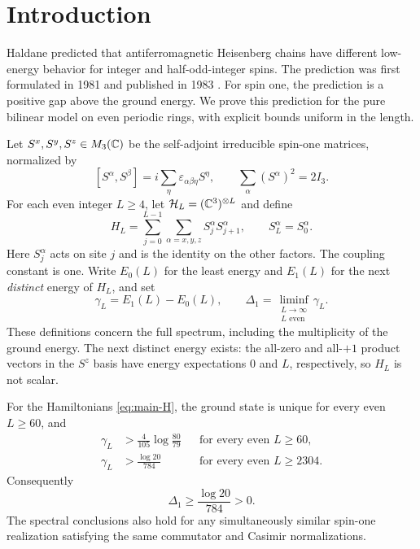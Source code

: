 \section{Introduction}\label{sec:introduction}

Haldane predicted that antiferromagnetic Heisenberg chains have different
low-energy behavior for integer and half-odd-integer spins. The prediction
was first formulated in 1981 and published in 1983
\cite{Haldane1981,Haldane1983PRL,Haldane1983PLA}. For spin one, the prediction is a
positive gap above the ground energy. We prove this prediction for the
pure bilinear model on even periodic rings, with explicit bounds uniform
in the length.

Let $S^x,S^y,S^z\in M_3(\mathbb C)$ be the self-adjoint irreducible spin-one
matrices, normalized by
\[
 [S^\alpha,S^\beta]
   =i\sum_\eta\varepsilon_{\alpha\beta\eta}S^\eta,
 \qquad \sum_\alpha(S^\alpha)^2=2I_3.
\]
For each even integer $L\ge4$, let $\mathcal H_L=(\mathbb C^3)^{\otimes L}$ and define
\begin{equation}\label{eq:main-H}
 H_L=\sum_{j=0}^{L-1}\sum_{\alpha=x,y,z}
       S_j^\alpha S_{j+1}^\alpha,
 \qquad S_L^\alpha=S_0^\alpha.
\end{equation}
Here $S_j^\alpha$ acts on site $j$ and is the identity on the other
factors. The coupling constant is one. Write $E_0(L)$ for the least
energy and $E_1(L)$ for the next \emph{distinct} energy of $H_L$, and set
\begin{equation}\label{eq:main-gap}
 \gamma_L=E_1(L)-E_0(L),
 \qquad
 \Delta_1=\liminf_{\substack{L\to\infty\\L\text{ even}}}\gamma_L.
\end{equation}
These definitions concern the full spectrum, including the multiplicity
of the ground energy. The next distinct energy exists: the all-zero and
all-$+1$ product vectors in the $S^z$ basis have energy expectations
$0$ and $L$, respectively, so $H_L$ is not scalar.

\begin{theorem}\label{thm:main}
For the Hamiltonians \eqref{eq:main-H}, the ground state is unique for
every even $L\ge60$, and
\begin{align}
 \gamma_L&>\frac4{105}\log\frac{80}{79}
     &&\text{for every even }L\ge60,\label{eq:gap60}\\
 \gamma_L&>\frac{\log20}{784}
     &&\text{for every even }L\ge2304.\label{eq:gap2304}
\end{align}
Consequently
\[
 \Delta_1\ge\frac{\log20}{784}>0.
\]
The spectral conclusions also hold for any simultaneously similar
spin-one realization satisfying the same commutator and Casimir
normalizations.
\end{theorem}

